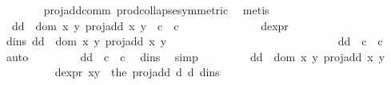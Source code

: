 \begin{isabellebody}
\ \ \ \ \ \ \isamarkupfalse%
\ proj{\isacharunderscore}add{\isacharunderscore}comm\ prod{\isachardot}collapse{\isacharbrackleft}symmetric{\isacharbrackright}\ \isamarkupfalse%
\ metis\isanewline
\ \ \ \ \isamarkupfalse%
\ {}{\isacharcolon}\ {\isachardoublequoteopen}{\isacharparenleft}d{}{\isacharcomma}d{}{\isacharparenright}\ {\isasymin}\ dom\ {\isacharparenleft}{\isasymlambda}{\isacharparenleft}x{\isacharcomma}\ y{\isacharparenright}{\isachardot}\ proj{\isacharunderscore}add\ x\ y{\isacharparenright}\ {\isasyminter}\ c{}\ {\isasymtimes}\ c{}{\isachardoublequoteclose}\isanewline
\ \ \ \ \isamarkupfalse%
\ {\isacharminus}\isanewline
\ \ \ \ \ \ \isamarkupfalse%
\ d{\isacharunderscore}expr\ \isamarkupfalse%
\ d{\isacharunderscore}ins{\isacharcolon}\ {\isachardoublequoteopen}{\isacharparenleft}d{}{\isacharcomma}d{}{\isacharparenright}\ {\isasymin}\ dom\ {\isacharparenleft}{\isasymlambda}{\isacharparenleft}x{\isacharcomma}\ y{\isacharparenright}{\isachardot}\ proj{\isacharunderscore}add\ x\ y{\isacharparenright}{\isachardoublequoteclose}\isanewline
\ \ \ \ \ \ \ \ \ \ \ \ \ \ \ \ \ \ \ \ \ \ \ \ \ \ \ \ \ \ {\isachardoublequoteopen}{\isacharparenleft}d{}{\isacharcomma}d{}{\isacharparenright}\ {\isasymin}\ c{}\ {\isasymtimes}\ c{}{\isachardoublequoteclose}\ \isamarkupfalse%
\ auto\isanewline
\ \ \ \ \ \ \isamarkupfalse%
\ {}{\isacharcolon}\ {\isachardoublequoteopen}{\isacharparenleft}d{}{\isacharcomma}d{}{\isacharparenright}\ {\isasymin}\ c{}\ {\isasymtimes}\ c{}{\isachardoublequoteclose}\ \isamarkupfalse%
\ d{\isacharunderscore}ins{\isacharparenleft}{}{\isacharparenright}\ \isamarkupfalse%
\ simp\isanewline
\ \ \ \ \ \ \isamarkupfalse%
\ {}{\isacharcolon}\ {\isachardoublequoteopen}{\isacharparenleft}d{}{\isacharcomma}d{}{\isacharparenright}\ {\isasymin}\ dom\ {\isacharparenleft}{\isasymlambda}{\isacharparenleft}x{\isacharcomma}\ y{\isacharparenright}{\isachardot}\ proj{\isacharunderscore}add\ x\ y{\isacharparenright}{\isachardoublequoteclose}\ \isanewline
\ \ \ \ \ \ \ \ \isamarkupfalse%
\ d{\isacharunderscore}expr\ {\isacartoucheopen}{\isacharparenleft}x{\isacharcomma}y{\isacharparenright}\ {\isacharequal}\ the\ {\isacharparenleft}proj{\isacharunderscore}add\ d{}\ d{}{\isacharparenright}{\isacartoucheclose}\ d{\isacharunderscore}ins{\isacharparenleft}{}{\isacharparenright}\isanewline

\end{isabellebody}
